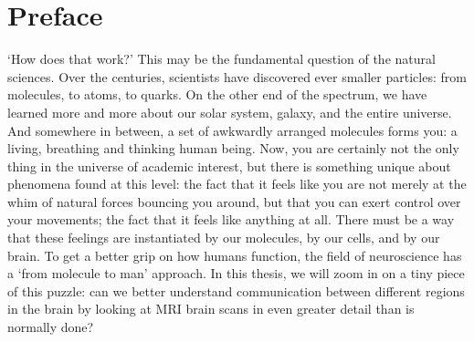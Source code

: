 \section*{Preface}
`How does that work?' This may be the fundamental question of the natural sciences.
Over the centuries, scientists have discovered ever smaller particles: from molecules, to atoms, to quarks. On the other end of the spectrum, we have learned more and more about our solar system, galaxy, and the entire universe. And somewhere in between, a set of awkwardly arranged molecules forms you: a living, breathing and thinking human being.
Now, you are certainly not the only thing in the universe of academic interest, but there is something unique about phenomena found at this level: the fact that it feels like you are not merely at the whim of natural forces bouncing you around, but that you can exert control over your movements; the fact that it feels like anything at all. There must be a way that these feelings are instantiated by our molecules, by our cells, and by our brain.
To get a better grip on how humans function, the field of neuroscience has a `from molecule to man' approach. In this thesis, we will zoom in on a tiny piece of this puzzle: can we better understand communication between different regions in the brain by looking at MRI brain scans in even greater detail than is normally done?
